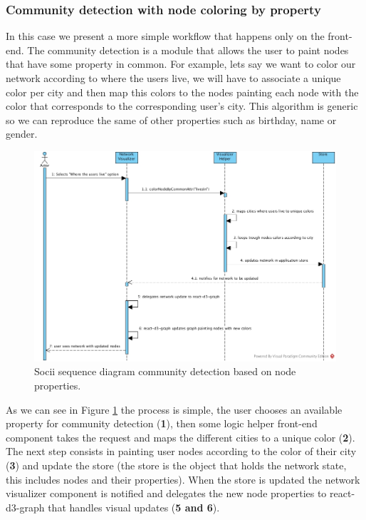\subsubsection{Community detection with node coloring by property}

In this case we present a more simple workflow that happens only on the front-end. The community detection is a module that allows the user to paint nodes that have some property in common. For example, lets say we want to color our network according to where the users live, we will have to associate a unique color per city and then map this colors to the nodes painting each node with the color that corresponds to the corresponding user's city. This algorithm is generic so we can reproduce the same of other properties such as birthday, name or gender.

\begin{figure}[h!]
\begin{center}
  \hspace*{-0.8in}
  \includegraphics[width=1.2\textwidth]{img/socii-cdet.jpg}
\end{center}
\caption{\label{img:sociicdet} Socii sequence diagram community detection based on node properties.}
\end{figure}

As we can see in Figure \ref{img:sociicdet} the process is simple, the user chooses an available property for community detection (\textbf{1}), then some logic helper front-end component takes the request and maps the different cities to a unique color (\textbf{2}). The next step consists in painting user nodes according to the color of their city (\textbf{3}) and update the store (the store is the object that holds the network state, this includes nodes and their properties). When the store is updated the network visualizer component is notified and delegates the new node properties to react-d3-graph that handles visual updates (\textbf{5 and 6}).
